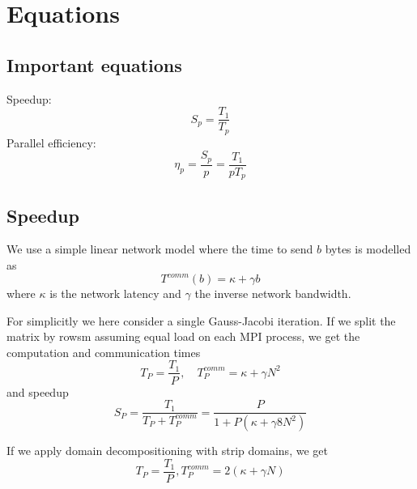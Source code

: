 
\section{Equations} %
\label{sec:equations}

\subsection{Important equations} %
\label{sub:important_equations}
Speedup:
\begin{equation}
  S_p = \frac{T_1}{T_p}
\end{equation}
Parallel efficiency:
\begin{equation}
  \eta_p = \frac{S_p}{p} = \frac{T_1}{pT_p}
\end{equation}

\subsection{Speedup} %
\label{sub:speedup}

We use a simple linear network model where the time to send $b$ bytes is modelled as
\begin{equation}
  T^{comm}(b) = \kappa + \gamma b
\end{equation}
where $\kappa$ is the network latency and $\gamma$ the inverse network bandwidth.

For simplicitly we here consider a single Gauss-Jacobi iteration. If we split the matrix by rowsm assuming equal load on each MPI process, we get the computation and communication times
\begin{equation}
  T_P = \frac{T_1}{P}, \quad T_P^{comm} = \kappa + \gamma N^2
\end{equation}
and speedup
\begin{equation}
  S_P = \frac{T_1}{T_P+T_P^{comm}} = \frac{P}{1+P(\kappa + \gamma 8N^2)}
\end{equation}

If we apply domain decompositioning with strip domains, we get
\begin{equation}
  T_P = \frac{T_1}{P}, T_P^{comm} = 2 (\kappa + \gamma N)
\end{equation}


